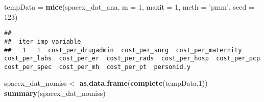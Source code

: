 \documentclass[]{article}
\newenvironment{Shaded}{\begin{snugshade}}{\end{snugshade}}
\newcommand{\KeywordTok}[1]{\textcolor[rgb]{0.13,0.29,0.53}{\textbf{#1}}}
\newcommand{\DataTypeTok}[1]{\textcolor[rgb]{0.13,0.29,0.53}{#1}}
\newcommand{\DecValTok}[1]{\textcolor[rgb]{0.00,0.00,0.81}{#1}}
\newcommand{\StringTok}[1]{\textcolor[rgb]{0.31,0.60,0.02}{#1}}
\newcommand{\NormalTok}[1]{#1}
\begin{document}
\begin{Shaded}
\begin{Highlighting}[]
\NormalTok{tempData =}\StringTok{ }\KeywordTok{mice}\NormalTok{(spacex_dat_ana, }\DataTypeTok{m =} \DecValTok{1}\NormalTok{, }\DataTypeTok{maxit =} \DecValTok{1}\NormalTok{, }\DataTypeTok{meth =} \StringTok{'pmm'}\NormalTok{, }\DataTypeTok{seed =} \DecValTok{123}\NormalTok{)}
\end{Highlighting}
\end{Shaded}

\begin{verbatim}
## 
##  iter imp variable
##   1   1  cost_per_drugadmin  cost_per_surg  cost_per_maternity  cost_per_labs  cost_per_er  cost_per_rads  cost_per_hosp  cost_per_pcp  cost_per_spec  cost_per_mh  cost_per_pt  personid.y
\end{verbatim}

\begin{Shaded}
\begin{Highlighting}[]
\NormalTok{spacex_dat_nomiss <-}\StringTok{ }\KeywordTok{as.data.frame}\NormalTok{(}\KeywordTok{complete}\NormalTok{(tempData,}\DecValTok{1}\NormalTok{))}
\KeywordTok{summary}\NormalTok{(spacex_dat_nomiss)}
\end{Highlighting}
\end{Shaded}
\end{document}
